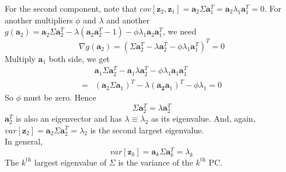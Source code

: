 \documentclass[../main.tex]{subfiles}
\begin{document}
            For the second component, note that $cov[\mathbf{z}_2, \mathbf{z}_1]=\mathbf{a}_2\Sigma\mathbf{a}_1^T=\mathbf{a}_2\lambda_1\mathbf{a}_1^T=0$. For another multipliers $\phi$ and $\lambda$ and another $g(\mathbf{a}_2)=\mathbf{a}_2\Sigma\mathbf{a}_2^T-\lambda(\mathbf{a}_2\mathbf{a}_2^T-1)-\phi\lambda_1\mathbf{a}_2\mathbf{a}_1^T$, we need
            \[
                \nabla g(\mathbf{a}_2) = (\Sigma\mathbf{a}_2^T-\lambda\mathbf{a}_2^T-\phi\lambda_1\mathbf{a}_1^T)^T=0
            \]
            Multiply $\mathbf{a}_1$ both side, we get
            \begin{align*}
                &\mathbf{a}_1\Sigma\mathbf{a}_2^T - \mathbf{a}_1\lambda\mathbf{a}_2^T-\phi\lambda_1\mathbf{a}_1\mathbf{a}_1^T\\
                =&(\mathbf{a}_2\Sigma\mathbf{a}_1)^T-\lambda(\mathbf{a_2}\mathbf{a}_1)^T-\phi\lambda_1=0
            \end{align*}
            So $\phi$ must be zero. Hence
            \[
                \Sigma\mathbf{a}_2^T = \lambda\mathbf{a}_2^T
            \]
            $\mathbf{a}_2^T$ is also an eigenvector and has $\lambda\equiv\lambda_2$ as its eigenvalue. And, again, $var[\mathbf{z}_2]=\mathbf{a}_2\Sigma\mathbf{a}_2^T=\lambda_2$ is the second largest eigenvalue.\\[0.2cm]
            In general,
            \[
                var[\mathbf{z}_k]=\mathbf{a}_k\Sigma\mathbf{a}_k^T=\lambda_k
            \]
            The $k^\mathrm{th}$ largest eigenvalue of $\Sigma$ is the variance of the $k^\mathrm{th}$ PC.
\end{document}
